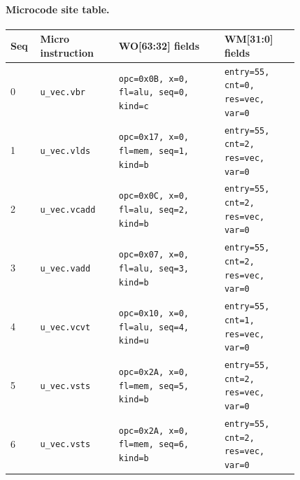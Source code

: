 \paragraph{Microcode site table.}
{\scriptsize
\begin{longtable}{@{}R{0.055\linewidth}L{0.23\linewidth}L{0.31\linewidth}L{0.22\linewidth}@{}}
\toprule
Seq & Micro instruction & WO[63:32] fields & WM[31:0] fields \\
 & \texttt{u\_vec.vbr} & \texttt{opc=0x0B, x=0, fl=alu, seq=0, kind=c} & \texttt{entry=55, cnt=0, res=vec, var=0} \\
1 & \texttt{u\_vec.vlds} & \texttt{opc=0x17, x=0, fl=mem, seq=1, kind=b} & \texttt{entry=55, cnt=2, res=vec, var=0} \\
2 & \texttt{u\_vec.vcadd} & \texttt{opc=0x0C, x=0, fl=alu, seq=2, kind=b} & \texttt{entry=55, cnt=2, res=vec, var=0} \\
3 & \texttt{u\_vec.vadd} & \texttt{opc=0x07, x=0, fl=alu, seq=3, kind=b} & \texttt{entry=55, cnt=2, res=vec, var=0} \\
4 & \texttt{u\_vec.vcvt} & \texttt{opc=0x10, x=0, fl=alu, seq=4, kind=u} & \texttt{entry=55, cnt=1, res=vec, var=0} \\
5 & \texttt{u\_vec.vsts} & \texttt{opc=0x2A, x=0, fl=mem, seq=5, kind=b} & \texttt{entry=55, cnt=2, res=vec, var=0} \\
6 & \texttt{u\_vec.vsts} & \texttt{opc=0x2A, x=0, fl=mem, seq=6, kind=b} & \texttt{entry=55, cnt=2, res=vec, var=0} \\
\bottomrule
\end{longtable}
}
